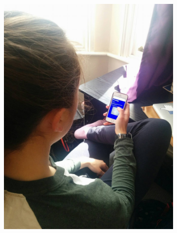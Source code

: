 \documentclass{article}
\begin{document}
\begin{figure}[ht]
	\centering
	\begin{subfigure}{}
	  \centering
			\includegraphics[scale=0.1]{prototype_use.jpg}
	\end{subfigure}%
	\begin{subfigure}{}
	  \centering

\end{subfigure}
\end{figure}
\end{document}
